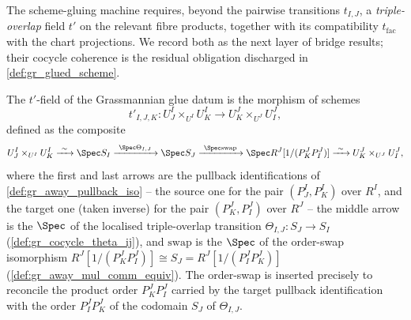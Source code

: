 The scheme-gluing machine requires, beyond the pairwise transitions \(t_{I,J}\), a
\emph{triple-overlap} field \(t'\) on the relevant fibre products, together with
its compatibility \(t_{\mathrm{fac}}\) with the chart projections. We record both
as the next layer of bridge results; their cocycle coherence is the residual
obligation discharged in \cref{def:gr_glued_scheme}.

\begin{definition}

  \label{def:gr_chart_transition'}
  The \(t'\)-field of the Grassmannian glue datum is the morphism of schemes
  \[
    t'_{I,J,K} : U^I_J \times_{U^I} U^I_K \longrightarrow U^J_K \times_{U^J} U^J_I ,
  \]
  defined as the composite
  \[
    U^I_J \times_{U^I} U^I_K
      \xrightarrow{\ \sim\ } \Spec S_I
      \xrightarrow{\ \Spec \Theta_{I,J}\ } \Spec S_J
      \xrightarrow{\ \Spec \mathrm{swap}\ } \Spec R^J[1/(P^J_K P^J_I)]
      \xrightarrow{\ \sim\ } U^J_K \times_{U^J} U^J_I ,
  \]
  where the first and last arrows are the pullback identifications of
  \cref{def:gr_away_pullback_iso} -- the source one for the pair \((P^I_J, P^I_K)\)
  over \(R^I\), and the target one (taken inverse) for the pair \((P^J_K, P^J_I)\)
  over \(R^J\) -- the middle arrow is the \(\Spec\) of the localised
  triple-overlap transition \(\Theta_{I,J} : S_J \to S_I\)
  (\cref{def:gr_cocycle_theta_ij}), and \(\mathrm{swap}\) is the \(\Spec\) of the
  order-swap isomorphism \(R^J[1/(P^J_K P^J_I)] \cong S_J = R^J[1/(P^J_I P^J_K)]\)
  (\cref{def:gr_away_mul_comm_equiv}). The order-swap is inserted precisely to
  reconcile the product order \(P^J_K P^J_I\) carried by the target pullback
  identification with the order \(P^J_I P^J_K\) of the codomain \(S_J\) of
  \(\Theta_{I,J}\).
\end{definition}

